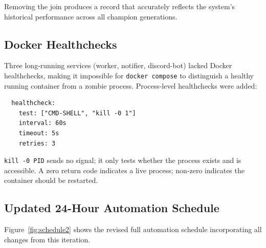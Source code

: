 \documentclass[conference]{IEEEtran}
\begin{document}
Removing the join produces a record that accurately reflects the
system's historical performance across all champion generations.

\subsection{Docker Healthchecks}

Three long-running services (worker, notifier, discord-bot) lacked
Docker healthchecks, making it impossible for \texttt{docker
compose} to distinguish a healthy running container from a zombie
process.  Process-level healthchecks were added:
\begin{verbatim}
  healthcheck:
    test: ["CMD-SHELL", "kill -0 1"]
    interval: 60s
    timeout: 5s
    retries: 3
\end{verbatim}
\texttt{kill -0 PID} sends no signal; it only tests whether the
process exists and is accessible.  A zero return code indicates a
live process; non-zero indicates the container should be restarted.

\subsection{Updated 24-Hour Automation Schedule}

Figure~\ref{fig:schedule2} shows the revised full automation
schedule incorporating all changes from this iteration.
\end{document}
